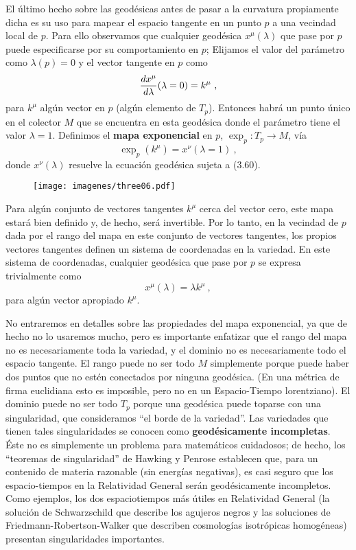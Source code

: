 \documentclass[11pt,b5paper,openany,twoside]{book}
\begin{document}
El último hecho sobre las geodésicas antes de pasar a la curvatura propiamente dicha es su uso para mapear el espacio tangente en un punto $p$ a una vecindad local de $p$.
Para ello observamos que cualquier geodésica $x^\mu(\lambda)$ que pase por $p$ puede especificarse por su comportamiento en $p$; Elijamos el valor del parámetro como $\lambda(p)=0$ y el vector tangente en $p$ como
\begin{equation}
{{d x^\mu}\over{d\lambda}}(\lambda=0)=k^\mu\ ,\label{3.60}
\end{equation}
para $k^\mu$ algún vector en $p$ (algún elemento de $T_p$).
Entonces habrá un punto único en el colector $M$ que se encuentra en esta geodésica donde el parámetro tiene el valor $\lambda=1$.
Definimos el {\bf mapa exponencial} en $p$, $\exp_p :T_p\rightarrow M$, vía
\begin{equation}
\exp_p(k^\mu) = x^\nu(\lambda = 1)\ ,\label{3.61}
\end{equation}
donde $x^\nu(\lambda)$ resuelve la ecuación geodésica sujeta a (3.60).
\begin{figure}[h]
\centering
\texttt{[image: imagenes/three06.pdf]}
\end{figure}
Para algún conjunto de vectores tangentes $k^\mu$ cerca del vector cero, este mapa estará bien definido y, de hecho, será invertible.
Por lo tanto, en la vecindad de $p$ dada por el rango del mapa en este conjunto de vectores tangentes, los propios vectores tangentes definen un sistema de coordenadas en la variedad.
En este sistema de coordenadas, cualquier geodésica que pase por $p$ se expresa trivialmente como
\begin{equation}
x^\mu(\lambda) = \lambda k^\mu\ ,\label{3.62}
\end{equation}
para algún vector apropiado $k^\mu$.

No entraremos en detalles sobre las propiedades del mapa exponencial, ya que de hecho no lo usaremos mucho, pero es importante enfatizar que el rango del mapa no es necesariamente toda la variedad, y el dominio no es necesariamente todo el espacio tangente.
El rango puede no ser todo $M$ simplemente porque puede haber dos puntos que no estén conectados por ninguna geodésica.
(En una métrica de firma euclidiana esto es imposible, pero no en un Espacio-Tiempo lorentziano).
El dominio puede no ser todo $T_p$ porque una geodésica puede toparse con una singularidad, que consideramos ``el borde de la variedad''. Las variedades que tienen tales singularidades se conocen como {\bf geodésicamente incompletas}.
Éste no es simplemente un problema para matemáticos cuidadosos; de hecho, los ``teoremas de singularidad'' de Hawking y Penrose establecen que, para un contenido de materia razonable (sin energías negativas), es casi seguro que los espacio-tiempos en la Relatividad General serán geodésicamente incompletos.
Como ejemplos, los dos espaciotiempos más útiles en Relatividad General (la solución de Schwarzschild que describe los agujeros negros y las soluciones de Friedmann-Robertson-Walker que describen cosmologías isotrópicas homogéneas) presentan singularidades importantes.
\end{document}

